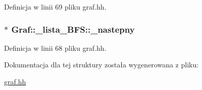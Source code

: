 \-Definicja w linii 69 pliku graf.\-hh.

\hypertarget{struct_graf_1_1__lista___b_f_s_ad101a4841ac1d7c783fc24c4ef6790c1}{
\subsubsection[{\-\_\-nastepny}]{$\ast$ {\bf \-Graf\-::\-\_\-lista\-\_\-\-B\-F\-S\-::\-\_\-nastepny}}}\label{struct_graf_1_1__lista___b_f_s_ad101a4841ac1d7c783fc24c4ef6790c1}


\-Definicja w linii 68 pliku graf.\-hh.



\-Dokumentacja dla tej struktury została wygenerowana z pliku\-:\begin{DoxyCompactItemize}
\item 
\hyperlink{graf_8hh}{graf.\-hh}\end{DoxyCompactItemize}
